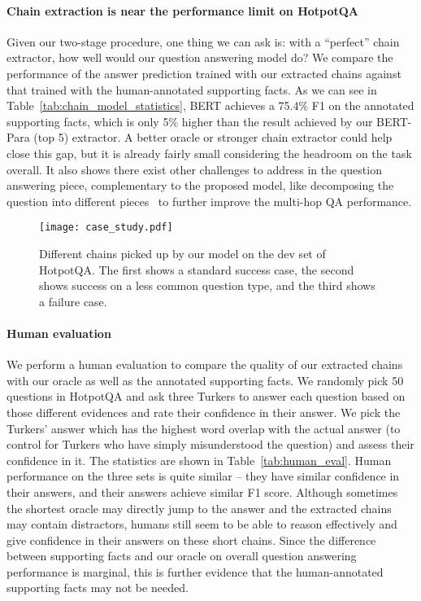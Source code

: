 \documentclass[11pt,a4paper]{article}
\begin{document}
\paragraph{Chain extraction is near the performance limit on HotpotQA} Given our two-stage procedure, one thing we can ask is: with a ``perfect'' chain extractor, how well would our question answering model do? We compare the performance of the answer prediction trained with our extracted chains against that trained with the human-annotated supporting facts. As we can see in Table~\ref{tab:chain_model_statistics}, BERT achieves a 75.4\% F1 on the annotated supporting facts, which is only 5\% higher than the result achieved by our BERT-Para (top 5) extractor. A better oracle or stronger chain extractor could help close this gap, but it is already fairly small considering the headroom on the task overall. It also shows there exist other challenges to address in the question answering piece, complementary to the proposed model, like decomposing the question into different pieces~\citep{MinZZH19} to further improve the multi-hop QA performance.

\begin{figure*}[t]
\centering
\texttt{[image: case\_study.pdf]}
\caption{Different chains picked up by our model on the dev set of HotpotQA. The first shows a standard success case, the second shows success on a less common question type, and the third shows a failure case.}
\vspace{-0.5cm}
    \label{fig:case_study}
\end{figure*}

\paragraph{Human evaluation}
We perform a human evaluation to compare the quality of our extracted chains with our oracle as well as the annotated supporting facts. We randomly pick 50 questions in HotpotQA and ask three Turkers to answer each question based on those different evidences and rate their confidence in their answer. We pick the Turkers' answer which has the highest word overlap with the actual answer (to control for Turkers who have simply misunderstood the question) and assess their confidence in it. The statistics are shown in Table~\ref{tab:human_eval}. Human performance on the three sets is quite similar -- they have similar confidence in their answers, and their answers achieve similar F1 score. Although sometimes the shortest oracle may directly jump to the answer and the extracted chains may contain distractors, humans still seem to be able to reason effectively and give confidence in their answers on these short chains. Since the difference between supporting facts and our oracle on overall question answering performance is marginal, this is further evidence that the human-annotated supporting facts may not be needed.
\end{document}
